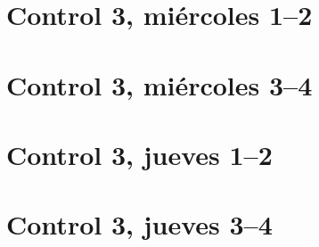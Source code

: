 \documentclass[12pt,spanish,a5paper,landscape]{article}
\begin{document}
  \pagestyle{empty}
  \thispagestyle{empty}

  \part*{Control 3, miércoles 1--2}
  \newpage

  \newpage
  \part*{Control 3, miércoles 3--4}
  \newpage

  \newpage
  \part*{Control 3, jueves 1--2}
  \newpage

  \newpage
  \part*{Control 3, jueves 3--4}
  \newpage
\end{document}
